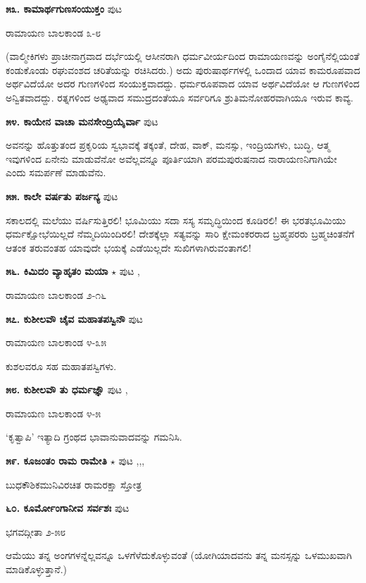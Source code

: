 \medskip
\noindent\textbf{೫೩. ಕಾಮಾರ್ಥಗುಣಸಂಯುಕ್ತಂ} \hfill ಪುಟ \pageref{212}

\hfill ರಾಮಾಯಣ ಬಾಲಕಾಂಡ ೩-೮
 
 (ವಾಲ್ಮೀಕಿಗಳು ಪ್ರಾಚೀನಾಗ್ರವಾದ ದರ್ಭೆಯಲ್ಲಿ ಆಸೀನರಾಗಿ ಧರ್ಮವೀರ್ಯದಿಂದ ರಾಮಾಯಣವನ್ನು ಅಂಗೈನೆಲ್ಲಿಯಂತೆ ಕಂಡುಕೊಂಡು ರಘುವಂಶದ ಚರಿತೆಯನ್ನು ರಚಿಸಿದರು.) ಅದು ಪುರುಷಾರ್ಥಗಳಲ್ಲಿ ಒಂದಾದ ಯಾವ ಕಾಮರೂಪವಾದ ಅರ್ಥವಿದೆಯೋ ಅದರ ಗುಣಗಳಿಂದ ಸಂಯುಕ್ತವಾದದ್ದು. ಧರ್ಮರೂಪವಾದ ಯಾವ ಅರ್ಥವಿದೆಯೋ ಆ ಗುಣಗಳಿಂದ ಅನ್ವಿತವಾದದ್ದು. ರತ್ನಗಳಿಂದ ಅಢ್ಯವಾದ ಸಮುದ್ರದಂತೆಯೂ ಸರ್ವರಿಗೂ ಶ್ರುತಿಮನೋಹರವಾಗಿಯೂ ಇರುವ ಕಾವ್ಯ.
 
\medskip
\noindent\textbf{೫೪. ಕಾಯೇನ ವಾಚಾ ಮನಸೇಂದ್ರಿಯೈರ್ವಾ} \hfill ಪುಟ \pageref{219}

ಅವನನ್ನು ಹೊತ್ತುತಂದ ಪ್ರಕೃರಿಯ ಸ್ವಭಾವಕ್ಕೆ ತಕ್ಕಂತೆ, ದೇಹ, ವಾಕ್, ಮನಸ್ಸು, ಇಂದ್ರಿಯಗಳು, ಬುದ್ಧಿ, ಆತ್ಮ ಇವುಗಳಿಂದ ಏನೇನು ಮಾಡುವೆನೋ ಅವೆಲ್ಲವನ್ನೂ ಪೂರ್ತಿಯಾಗಿ ಪರಮಪುರುಷನಾದ ನಾರಾಯಣನಿಗಾಗಿಯೇ ಎಂದು ಸಮರ್ಪಣೆ ಮಾಡುವೆನು.

\medskip
\noindent\textbf{೫೫. ಕಾಲೇ ವರ್ಷತು ಪರ್ಜನ್ಯ} \hfill ಪುಟ \pageref{149a}

ಸಕಾಲದಲ್ಲಿ ಮಲೆಯು ವರ್ಷಿಸುತ್ತಿರಲಿ! ಭೂಮಿಯು ಸದಾ ಸಸ್ಯ ಸಮೃದ್ಧಿಯಿಂದ ಕೂಡಿರಲಿ! ಈ ಭರತಭೂಮಿಯು ಧರ್ಮಕ್ಷೋಭೆಯಿಲ್ಲದೆ ನೆಮ್ಮದಿಯಿಂದಿರಲಿ! ದೇಶಕ್ಕೆಲ್ಲಾ ಸತ್ಯವನ್ನು ಸಾರಿ ಕ್ಷೇಮಂಕರರಾದ ಬ್ರಹ್ಮಪರರು ಬ್ರಹ್ಮಚಿಂತನೆಗೆ ಆತಂಕ ತರುವಂತಹ ಯಾವುದೇ ಭಯಕ್ಕೆ ಎಡೆಯಿಲ್ಲದೇ ಸುಖಿಗಳಾಗಿರುವಂತಾಗಲಿ!

\medskip
\noindent\textbf{೫೬. ಕಿಮಿದಂ ವ್ಯಾಹೃತಂ ಮಯಾ} $\star$ \hfill ಪುಟ \pageref{20},\pageref{157}

\hfill ರಾಮಾಯಣ ಬಾಲಕಾಂಡ ೨-೧೬

\medskip
\noindent\textbf{೫೭. ಕುಶೀಲವೌ ಚೈವ ಮಹಾತಪಸ್ವಿನೌ} \hfill ಪುಟ \pageref{167a}

\hfill ರಾಮಾಯಣ ಬಾಲಕಾಂಡ ೪-೩೫

ಕುಶಲವರೂ ಸಹ ಮಹಾತಪಸ್ವಿಗಳು.

\medskip
\noindent\textbf{೫೮. ಕುಶೀಲವೌ ತು ಧರ್ಮಜ್ಞೌ} \hfill ಪುಟ \pageref{238b},\pageref{240}

\hfill ರಾಮಾಯಣ ಬಾಲಕಾಂಡ ೪-೫

`ಕೃತ್ವಾಪಿ' ಇತ್ಯಾದಿ ಗ್ರಂಥದ ಭಾವಾನುವಾದವನ್ನು ಗಮನಿಸಿ.

\medskip
\noindent\textbf{೫೯. ಕೂಜಂತಂ ರಾಮ ರಾಮೇತಿ} $\star$ \hfill ಪುಟ \pageref{136},\pageref{148},\pageref{169},\pageref{184}

\hfill ಬುಧಕೌಶಿಕಮುನಿವಿರಚಿತ ರಾಮರಕ್ಷಾ ಸ್ತೋತ್ರ

\medskip
\noindent\textbf{೬೦. ಕೂರ್ಮೋಂಗಾನೀವ ಸರ್ವಶಃ} \hfill ಪುಟ \pageref{222}

\hfill ಭಗವದ್ಗೀತಾ ೨-೫೮

ಆಮೆಯು ತನ್ನ ಅಂಗಗಳನ್ನೆಲ್ಲವನ್ನೂ ಒಳಗೆಳೆದುಕೊಳ್ಳುವಂತೆ (ಯೋಗಿಯಾದವನು ತನ್ನ ಮನಸ್ಸನ್ನು ಒಳಮುಖವಾಗಿ ಮಾಡಿಕೊಳ್ಳುತ್ತಾನೆ.)

